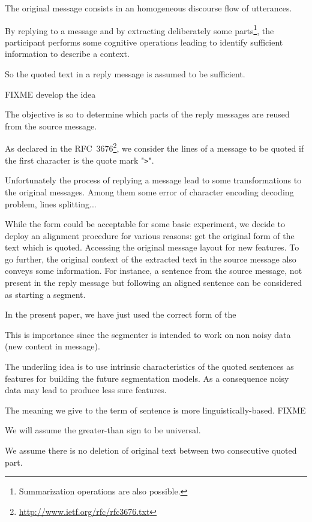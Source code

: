 The original message consists in an homogeneous discourse flow of utterances. 

By replying to a message and by extracting deliberately some parts\footnote{Summarization operations are also possible.}, the participant performs some cognitive operations leading to identify sufficient information to describe a context.

So the quoted text in a reply message is assumed to be sufficient. 

FIXME develop the idea

The objective is so to determine which parts of the reply messages are reused from the source message.

As declared in the RFC~3676\footnote{\url{http://www.ietf.org/rfc/rfc3676.txt}}, we consider the lines of a message to be quoted if the first character is the quote mark "\texttt{>}".

Unfortunately the process of replying a message lead to some transformations to the original messages. Among them some error of character encoding decoding problem, lines splitting... 

While the form could be acceptable for some basic experiment, we decide to deploy an alignment procedure for various reasons: get the original form of the text which is quoted. 
Accessing the original message layout for new features. 
To go further, the original context of the extracted text in the source message also conveys some information.
For instance, a sentence from the source message, not present in the reply message but following an aligned sentence can be considered as starting a segment.

In the present paper, we have just used the correct form of the 

This is importance since the segmenter is intended to work on non noisy data (new content in message).

The underling idea is to use intrinsic characteristics of the quoted sentences as features for building the future segmentation models. As a consequence noisy data may lead to produce less sure features.


The meaning we give to the term of sentence is more linguistically-based. FIXME



We will assume the greater-than sign to be universal. 




We assume there is no deletion of original text between two consecutive quoted part.

